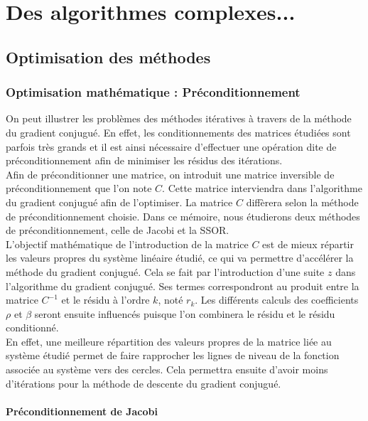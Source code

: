 \chapter{Des algorithmes complexes...}
\section{Optimisation des méthodes}
\subsection{Optimisation mathématique : Préconditionnement}

On peut illustrer les problèmes des méthodes itératives à travers de la méthode du gradient conjugué. En effet, les conditionnements des matrices étudiées sont parfois très grands et il est ainsi nécessaire d'effectuer une opération dite de préconditionnement afin de minimiser les résidus des itérations.\\

Afin de préconditionner une matrice, on introduit une matrice inversible de préconditionnement que l'on note $C$. Cette matrice interviendra dans l'algorithme du gradient conjugué afin de l'optimiser. La matrice $C$ diffèrera selon la méthode de préconditionnement choisie. Dans ce mémoire, nous étudierons deux méthodes de préconditionnement, celle de Jacobi et la SSOR. \\

L'objectif mathématique de l'introduction de la matrice $C$ est de mieux répartir les valeurs propres du système linéaire étudié, ce qui va permettre d'accélérer la méthode du gradient conjugué. Cela se fait par l'introduction d'une suite $z$ dans l'algorithme du gradient conjugué. Ses termes correspondront au produit entre la matrice $C^{-1}$ et le résidu à l'ordre $k$, noté $r_k$. Les différents calculs des coefficients $\rho$ et $\beta$ seront ensuite influencés puisque l'on combinera le résidu et le résidu conditionné. \\

En effet, une meilleure répartition des valeurs propres de la matrice liée au système étudié permet de faire rapprocher les lignes de niveau de la fonction associée au système vers des cercles. Cela permettra ensuite d'avoir moins d'itérations pour la méthode de descente du gradient conjugué.\\

\subsubsection{Préconditionnement de Jacobi}

